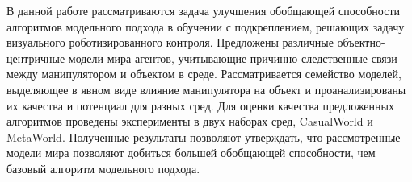 В данной работе рассматриваются задача улучшения обобщающей способности алгоритмов модельного подхода в обучении с подкреплением, решающих задачу визуального роботизированного контроля. Предложены различные объектно-центричные модели мира агентов, учитывающие причинно-следственные связи между манипулятором и объектом в среде. Рассматривается семейство моделей, выделяющее в явном виде влияние манипулятора на объект и проанализированы их качества и потенциал для разных сред. Для оценки качества предложенных алгоритмов проведены эксперименты в двух наборах сред, CasualWorld и MetaWorld. Полученные результаты позволяют утверждать, что рассмотренные модели мира позволяют добиться большей обобщающей способности, чем базовый алгоритм модельного подхода.